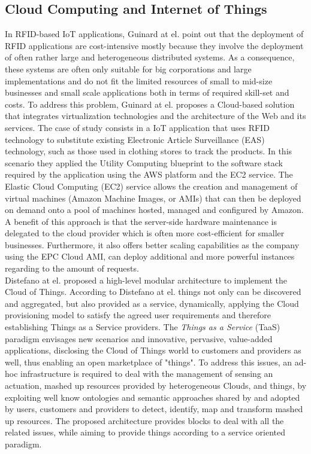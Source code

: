 \subsection{Cloud Computing and Internet of Things}
\label{sub:Cloud Computing and Internet of Things}
In RFID-based IoT applications, Guinard at el. \cite{guinard2011cloud} point out that the deployment of RFID applications are cost-intensive mostly
because they involve the deployment of often rather large and heterogeneous distributed systems. As a consequence, these systems are often only
suitable for big corporations and large implementations and do not fit the limited resources of small to mid-size businesses and small scale
applications both in terms of required skill-set and costs. To address this problem, Guinard at el. proposes a Cloud-based solution that
integrates virtualization technologies and the architecture of the Web and its services. The case of study consists in a IoT application that uses
RFID technology to substitute existing Electronic Article Surveillance (EAS) technology, such as those used in clothing stores to track the products.
In this scenario they applied the Utility Computing blueprint to the software stack required by the application using the AWS platform and the EC2 service.
The Elastic Cloud Computing (EC2) service allows the creation and management of virtual machines (Amazon Machine Images, or AMIs) that can then be deployed on
demand onto a pool of machines hosted, managed and configured by Amazon. A benefit of this approach is that the server-side hardware maintenance is delegated to
the cloud provider which is often more cost-efficient for smaller businesses. Furthermore, it also offers better scaling capabilities as the company using the
EPC Cloud AMI, can deploy additional and more powerful instances regarding to the amount of requests.\\

Distefano \cite{distefano2012enabling} at el. proposed a high-level modular architecture to implement the Cloud of Things. According to Distefano at el. things
not only can be discovered and aggregated, but also provided as a service, dynamically, applying the Cloud provisioning model to satisfy the agreed
user requirements and therefore establishing Things as a Service providers. The \textit{Things as a Service} (TaaS) paradigm envisages new scenarios
and innovative, pervasive, value-added applications, disclosing the Cloud of Things world to customers and providers as well, thus enabling an open
marketplace of "things". To address this issues, an ad-hoc infrastructure is required to deal with the management of sensing an actuation, mashed up
resources provided by heterogeneous Clouds, and things, by exploiting well know ontologies and semantic approaches shared by and adopted by users,
customers and providers to detect, identify, map and transform mashed up resources. The proposed architecture provides blocks to deal with all the
related issues, while aiming to provide things according to a service oriented paradigm.\\

